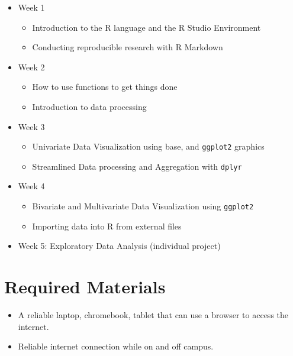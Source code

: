 \documentclass[
  11pt,
]{article}
\providecommand{\tightlist}{%
  \setlength{\itemsep}{0pt}\setlength{\parskip}{0pt}}
\begin{document}
\begin{itemize}
\tightlist
\item
  Week 1

  \begin{itemize}
  \tightlist
  \item
    Introduction to the R language and the R Studio Environment
  \item
    Conducting reproducible research with R Markdown
  \end{itemize}
\item
  Week 2

  \begin{itemize}
  \tightlist
  \item
    How to use functions to get things done
  \item
    Introduction to data processing
  \end{itemize}
\item
  Week 3

  \begin{itemize}
  \tightlist
  \item
    Univariate Data Visualization using base, and \texttt{ggplot2}
    graphics
  \item
    Streamlined Data processing and Aggregation with \texttt{dplyr}
  \end{itemize}
\item
  Week 4

  \begin{itemize}
  \tightlist
  \item
    Bivariate and Multivariate Data Visualization using \texttt{ggplot2}
  \item
    Importing data into R from external files
  \end{itemize}
\item
  Week 5: Exploratory Data Analysis (individual project)
\end{itemize}

\hypertarget{required-materials}{%
\section{Required Materials}\label{required-materials}}

\begin{itemize}
\tightlist
\item
  A reliable laptop, chromebook, tablet that can use a browser to access
  the internet.
\item
  Reliable internet connection while on and off campus.
\end{itemize}
\end{document}
